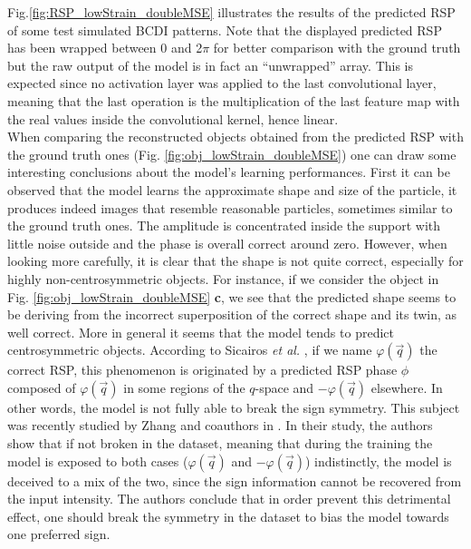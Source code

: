Fig.\ref{fig:RSP_lowStrain_doubleMSE} illustrates the results of the predicted RSP of some test simulated BCDI patterns. 
Note that the displayed predicted RSP has been wrapped between 0 and 2$\pi$ for better comparison with the ground truth 
but the raw output of the model is in fact an ``unwrapped'' array. This is expected since no activation layer was applied 
to the last convolutional layer, meaning that the last operation is the multiplication of the last feature map with the 
real values inside the convolutional kernel, hence linear. \\
When comparing the reconstructed objects obtained from the predicted RSP with the ground truth ones (Fig. \ref{fig:obj_lowStrain_doubleMSE})
one can draw some interesting conclusions about the model's learning performances. 
First it can be observed that the model learns the approximate shape and size of the particle, it produces indeed images 
that resemble reasonable particles, sometimes similar to the ground truth ones. The amplitude is concentrated inside 
the support with little noise outside and the phase is overall correct around zero. However, when looking more carefully, 
it is clear that the shape is not quite correct, especially for highly non-centrosymmetric objects. For instance, if we 
consider the object in Fig. \ref{fig:obj_lowStrain_doubleMSE} \textbf{c}, we see that the predicted shape seems to be 
deriving from the incorrect superposition of the correct shape and its twin, as well correct. More in general it seems 
that the model tends to predict centrosymmetric objects. According to Sicairos \textit{et al.} \cite{guizar-sicairos_understanding_2012}, 
if we name $\varphi(\vec{q})$ the correct RSP, this phenomenon is originated by a predicted RSP phase $\phi$ composed 
of $\varphi(\vec{q})$ in some regions of the $q$-space and $-\varphi(\vec{q})$ elsewhere. In other words, the model is not 
fully able to break the sign symmetry. This subject was recently studied by Zhang and coauthors in \cite{zhang_what_2024}. 
In their study, the authors show that if not broken in the dataset, meaning that during the 
training the model is exposed to both cases ($\varphi(\vec{q})$ and $-\varphi(\vec{q})$) indistinctly, the model is deceived 
to a mix of the two, since the sign information cannot be recovered from the input intensity. The authors conclude that 
in order prevent this detrimental effect, one should break the symmetry in the dataset to bias the model towards one 
preferred sign. 

